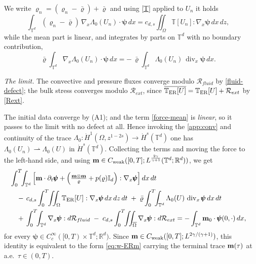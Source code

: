 \documentclass[12pt,a4paper,twoside]{article}
\newcommand{\Div}{\operatorname{div}}
\newcommand{\Ov}[1]{\overline{#1}}
\newcommand{\vr}{\varrho}
\newcommand{\vc}[1]{{\bf #1}}
\newcommand{\Grad}{\nabla}
\numberwithin{equation}{section}%
\newcommand{\vm}{\vc{m}}
\begin{document}
\medskip
We write $\vr_n = (\vr_n - \bar\vr) + \bar\vr$ and using \eqref{T} applied to $U_n$ it holds 
\begin{equation*}
	\int_{\mathbb T^d} (\vr_n - \bar\vr)\, \Grad_x\Lambda_0(U_n)\cdot\pmb\psi \,dx
	= c_{d,s} \iint_{\Omega} \mathbb T[U_n] : \Grad_x\pmb\psi \,dx\,dz ,
\end{equation*}
while the mean part is linear, and integrates by parts on $\mathbb T^d$ with no boundary contribution,
\begin{equation}\label{force-mean}
	\bar\vr \int_{\mathbb T^d} \Grad_x\Lambda_0(U_n)\cdot\pmb\psi \,dx
	= -\, \bar\vr \int_{\mathbb T^d} \Lambda_0(U_n)\, \Div_x\pmb\psi \,dx .
\end{equation}


\medskip
\noindent\emph{The limit.} The convective and pressure fluxes converge modulo $\mathcal R_{fluid}$ by \eqref{fluid-defect}; the bulk stress converges modulo $\mathcal R_{ext}$, since $\Ov{\mathbb T_{\rm ER}[U]} = \mathbb T_{\rm ER}[U] + \mathcal R_{ext}$ by \eqref{Rext}. \par 
 The initial data converge by (A1); and the term \eqref{force-mean} is \emph{linear}, so it passes to the limit with no defect at all. Hence invoking the \eqref{app:conv} and continuity of the trace $\Lambda_0 : \dot H^1(\Omega,z^{1-2s}) \to \dot H^s(\mathbb T^d)$ one has $\Lambda_0(U_n) \rightharpoonup \Lambda_0(U)$ in $\dot H^s(\mathbb T^d)$. Collecting the terms and moving the force to the left-hand side, and using $\vm\in C_{\mathrm{weak}}([0,T];L^{\frac{2\gamma}{\gamma+1}}(\mathbb T^d;\mathbb R^d))$, we get
 \begin{align*}
 	 		&\int_0^T\!\!\int_{\mathbb T^d} \Big[ \vm\cdot\partial_t\pmb\psi + \Big( \tfrac{\vm\otimes\vm}{\vr} + p(\vr)\mathbb I_d \Big) : \Grad_x\pmb\psi \Big]\,dx\,dt \\
 	&\quad -\, c_{d,s} \int_0^T\!\!\iint_{\Omega} \mathbb T_{\rm ER}[U] : \Grad_x\pmb\psi \,dx\,dz\,dt
 	\;+\; \bar\vr \int_0^T\!\!\int_{\mathbb T^d} \Lambda_0(U)\, \Div_x\pmb\psi \,dx\,dt \\
 	&\quad +\, \int_0^T\!\!\int_{\mathbb T^d} \Grad_x\pmb\psi : d\mathcal R_{fluid}
 	\;-\; c_{d,s} \int_0^T\!\!\iint_{\overline\Omega} \Grad_x\pmb\psi : d\mathcal R_{ext}
 	= -\int_{\mathbb T^d} \vm_0\cdot\pmb\psi(0,\cdot)\,dx ,
 \end{align*}
 for every $\pmb\psi\in C_c^\infty([0,T)\times\mathbb T^d;\mathbb R^d)$. Since $\vm\in C_{\mathrm{weak}}([0,T];L^{2\gamma/(\gamma+1)})$,
 this identity is equivalent to the form \eqref{eq:w-ERm} carrying the terminal trace $\vm(\tau)$ at a.e.\ $\tau\in(0,T)$.
\end{document}
